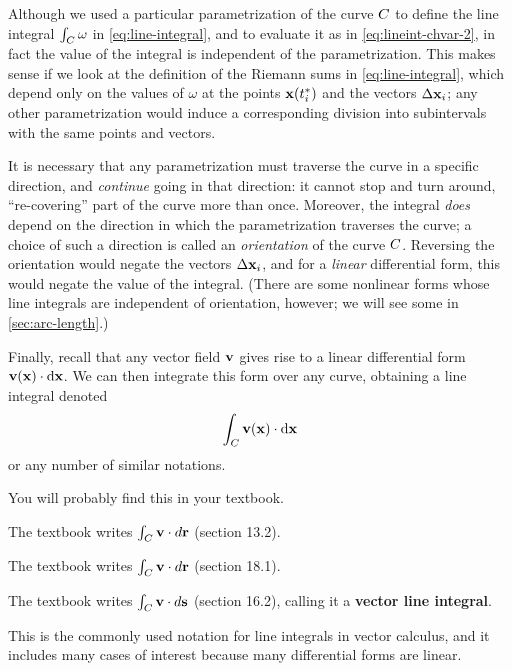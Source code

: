 \documentclass[12pt]{amsart}
\begin{document}
\begin{rmk}\label{rmk:lineint-orientation}
  Although we used a particular parametrization of the curve $C$ to define the line integral $\int_{C} \omega$ in \cref{eq:line-integral}, and to evaluate it as in \cref{eq:lineint-chvar-2}, in fact the value of the integral is independent of the parametrization.
  This makes sense if we look at the definition of the Riemann sums in \cref{eq:line-integral}, which depend only on the values of $\omega$ at the points $\mathbf{x}({t}_{i}^*)$ and the vectors $\Delta \mathbf{x}_i$; any other parametrization would induce a corresponding division into subintervals with the same points and vectors.

  It is necessary that any parametrization must traverse the curve in a specific direction, and \emph{continue} going in that direction: it cannot stop and turn around, ``re-covering'' part of the curve more than once.
  Moreover, the integral \emph{does} depend on the direction in which the parametrization traverses the curve; a choice of such a direction is called an \emph{orientation} of the curve $C$.
  Reversing the orientation would negate the vectors $\Delta \mathbf{x}_i$, and for a \emph{linear} differential form, this would negate the value of the integral.
  (There are some nonlinear forms whose line integrals are independent of orientation, however; we will see some in \cref{sec:arc-length}.)
\end{rmk}

Finally, recall that any vector field $\mathbf{v}$ gives rise to a linear differential form $\mathbf{v}(\mathbf{x}) \cdot {\ensuremath{\mathrm{d} \mathbf{x}}}$.
We can then integrate this form over any curve, obtaining a line integral denoted
\[ \int_{C} \mathbf{v}(\mathbf{x}) \cdot {\ensuremath{\mathrm{d} \mathbf{x}}} \]
or any number of similar notations.
\begin{notextbook}You will probably find this in your textbook.\end{notextbook}%
\begin{stewart}The textbook writes $\int_{C} \mathbf{v} \cdot d\mathbf{r}$ (section 13.2).\end{stewart}%
\begin{hugheshallett}The textbook writes $\int_{C} \mathbf{v} \cdot d\mathbf{r}$ (section 18.1).\end{hugheshallett}%
\begin{rogawski}The textbook writes $\int_{C} \mathbf{v} \cdot d\mathbf{s}$ (section 16.2), calling it a \textbf{vector line integral}.\end{rogawski}
This is the commonly used notation for line integrals in vector calculus, and it includes many cases of interest because many differential forms are linear.
\end{document}
